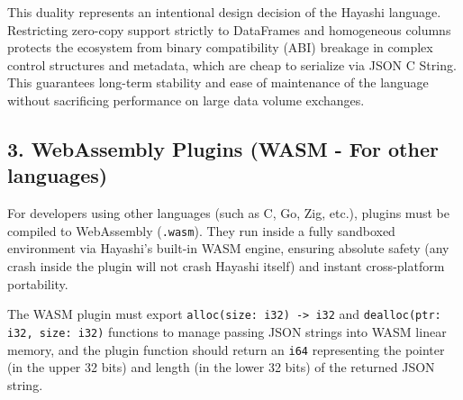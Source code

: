 This duality represents an intentional design decision of the Hayashi language. Restricting zero-copy support strictly to DataFrames and homogeneous columns protects the ecosystem from binary compatibility (ABI) breakage in complex control structures and metadata, which are cheap to serialize via JSON C String. This guarantees long-term stability and ease of maintenance of the language without sacrificing performance on large data volume exchanges.


\subsection{3. WebAssembly Plugins (WASM - For other languages)}
For developers using other languages (such as C, Go, Zig, etc.), plugins must be compiled to WebAssembly (\texttt{.wasm}). They run inside a fully sandboxed environment via Hayashi's built-in WASM engine, ensuring absolute safety (any crash inside the plugin will not crash Hayashi itself) and instant cross-platform portability.

The WASM plugin must export \texttt{alloc(size: i32) -> i32} and \texttt{dealloc(ptr: i32, size: i32)} functions to manage passing JSON strings into WASM linear memory, and the plugin function should return an \texttt{i64} representing the pointer (in the upper 32 bits) and length (in the lower 32 bits) of the returned JSON string.
